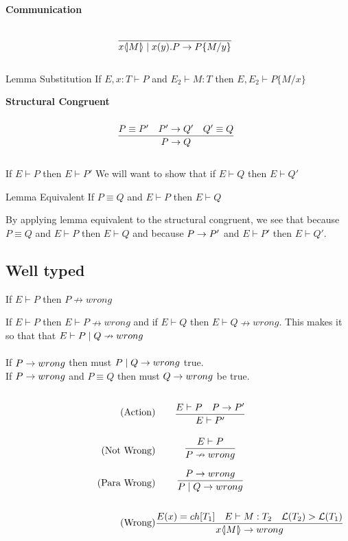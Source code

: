 \textbf{Communication}
\begin{align*}
\infrule{}{\lift{x}{M}\para\inp{x}{y}P\ra P\{M/y\}}
\end{align*}

Lemma Substitution
If \ensuremath{E,x:T \vdash P} and \ensuremath{E_2 \vdash M:T} then \ensuremath{E, E_2 \vdash P\{M/x \}}

\textbf{Structural Congruent}
\begin{align*}
\infrule{P\equiv P'\quad P'\ra Q'\quad Q'\equiv Q}{P\ra Q}
\end{align*}

If \ensuremath{E \vdash P} then \ensuremath{E \vdash P'} We will want to show that if \ensuremath{E \vdash Q} then \ensuremath{E \vdash Q'}

Lemma Equivalent
If \ensuremath{P \equiv Q} and \ensuremath{E \vdash P} then \ensuremath{E \vdash Q}

By applying lemma equivalent to the structural congruent, we see that because \ensuremath{P \equiv Q} and \ensuremath{E \vdash P} then \ensuremath{E \vdash Q} and because \ensuremath{P \ra P'} and \ensuremath{E \vdash P'} then \ensuremath{E \vdash Q'}.

\subsection{Well typed}
If \ensuremath{E\vdash P} then \ensuremath{P\nrightarrow wrong}

If \ensuremath{E \vdash P} then \ensuremath{E \vdash P \nrightarrow wrong} and if \ensuremath{E \vdash Q} then \ensuremath{E \vdash Q \nrightarrow wrong}. This makes it so that that \ensuremath{E \vdash P \para Q \nrightarrow wrong}
\\\\

If \ensuremath{P \ra wrong} then must \ensuremath{P \para Q \ra wrong} true.\\
If \ensuremath{P \ra wrong} and \ensuremath{P \equiv Q} then must \ensuremath{Q \ra wrong} be true.

\begin{align*}
\tag{Action} & \infrule{E \vdash P \quad P\ra P'}{E\vdash P'}\\
\tag{Not Wrong}& \infrule{E \vdash P}{P \nrightarrow wrong}\\
\tag{Para Wrong}& \infrule{P \ra wrong}{P\para Q \ra wrong}\\
\tag{Wrong}& \infrule{E(x) = ch[T_1] \quad E \vdash M:T_2 \quad \level{T_2} > \level{T_1} }{\lift{x}{M} \ra wrong}
\end{align*}


%
%

\FloatBarrier
